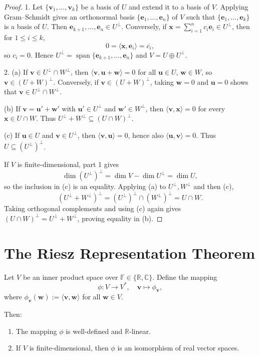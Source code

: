 \begin{proof}
1. Let $\{\mathbf v_1,\ldots,\mathbf v_k\}$ be a basis of $U$ and extend it to a basis of $V$. Applying Gram--Schmidt gives an orthonormal basis $\{\mathbf e_1,\ldots,\mathbf e_n\}$ of $V$ such that $\{\mathbf e_1,\ldots,\mathbf e_k\}$ is a basis of $U$. Then $\mathbf e_{k+1},\ldots,\mathbf e_n\in U^\perp$. Conversely, if $\mathbf x=\sum_{i=1}^n c_i\mathbf e_i\in U^\perp$, then for $1\leq i\leq k$,
\[
0=\langle \mathbf x,\mathbf e_i\rangle=\overline{c_i},
\]
so $c_i=0$. Hence $U^\perp=\operatorname{span}\{\mathbf e_{k+1},\ldots,\mathbf e_n\}$ and $V=U\oplus U^\perp$.

2. (a) If $\mathbf v\in U^\perp\cap W^\perp$, then $\langle\mathbf v,\mathbf u+\mathbf w\rangle=0$ for all $\mathbf u\in U$, $\mathbf w\in W$, so $\mathbf v\in(U+W)^\perp$. Conversely, if $\mathbf v\in(U+W)^\perp$, taking $\mathbf w=0$ and $\mathbf u=0$ shows that $\mathbf v\in U^\perp\cap W^\perp$.

(b) If $\mathbf v=\mathbf u'+\mathbf w'$ with $\mathbf u'\in U^\perp$ and $\mathbf w'\in W^\perp$, then $\langle\mathbf v,\mathbf x\rangle=0$ for every $\mathbf x\in U\cap W$. Thus $U^\perp+W^\perp\subseteq(U\cap W)^\perp$.

(c) If $\mathbf u\in U$ and $\mathbf v\in U^\perp$, then $\langle\mathbf v,\mathbf u\rangle=0$, hence also $\langle\mathbf u,\mathbf v\rangle=0$. Thus $U\subseteq(U^\perp)^\perp$.

If $V$ is finite-dimensional, part 1 gives
\[
\dim (U^\perp)^\perp=\dim V-\dim U^\perp=\dim U,
\]
so the inclusion in (c) is an equality. Applying (a) to $U^\perp,W^\perp$ and then (c),
\[
(U^\perp+W^\perp)^\perp=(U^\perp)^\perp\cap(W^\perp)^\perp=U\cap W.
\]
Taking orthogonal complements and using (c) again gives $(U\cap W)^\perp=U^\perp+W^\perp$, proving equality in (b).
\end{proof}



\section{The Riesz Representation Theorem}

\begin{theorem}\label{thm:riesz}
Let \( V \) be an inner product space over \( \mathbb{F} \in \{ \mathbb{R}, \mathbb{C} \} \). Define the mapping
\[
\phi : V \to V^*, \quad \mathbf{v} \mapsto \phi_{\mathbf{v}},
\]
where \( \phi_{\mathbf{v}}(\mathbf{w}) := \langle \mathbf{v}, \mathbf{w} \rangle \) for all \( \mathbf{w} \in V \).

Then:
\begin{enumerate}
    \item The mapping \( \phi \) is well-defined and \(\mathbb{R}\)-linear.
    \item If \( V \) is finite-dimensional, then \( \phi \) is an isomorphism of real vector spaces.
\end{enumerate}
\end{theorem}

